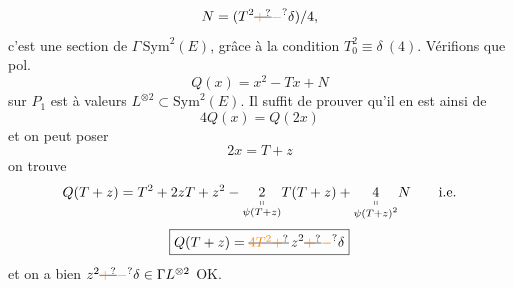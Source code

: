 \[
N=(T^2\deleted{\unsure{+}}\unsure{-}\delta)/4,
\]
c'est une section de $\Gamma\,\mathrm{Sym}^2(E)$, grâce à la condition $T_0^2\equiv\delta\ (4)$. Vérifions que   pol.
\[
Q(x)=x^2-Tx+N
\]
sur $P_1$ est à valeurs  $L^{\otimes2}\subset\mathrm{Sym}^2(E)$. Il suffit de prouver qu'il en est ainsi de
\[
4Q(x)=Q(2x)
\]
et on peut poser
\[
2x=T+z
\]
on trouve
\[
Q(T+z)=T^2+2zT+z^2-\underset{\substack{\shortparallel\\\psi(T+z)}}{2}T(T+z)+\underset{\substack{\shortparallel\\\psi(T+z)^2}}{4}N\qquad\text{i.e.}
\]
\[
\boxed{Q(T+z)=\deleted{\unsure{4T^2+}}\,z^2\deleted{\unsure{+}}\unsure{-}\delta}
\]
et on a bien $z^2\deleted{\unsure{+}}\unsure{-}\delta\in\Gamma L^{\otimes2}$ \quad OK.

